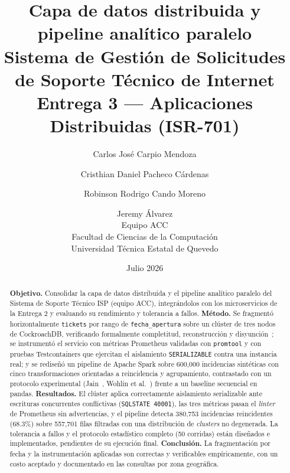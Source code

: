 \documentclass[11pt,letterpaper]{article}
\title{\textbf{Capa de datos distribuida y pipeline anal\'itico paralelo}\\
\large Sistema de Gesti\'on de Solicitudes de Soporte T\'ecnico de Internet\\
\large Entrega 3 --- Aplicaciones Distribuidas (ISR-701)}
\author{
Carlos Jos\'e Carpio Mendoza \and
Cristhian Daniel Pacheco C\'ardenas \and
Robinson Rodrigo Cando Moreno \and
Jeremy \'Alvarez\\[1em]
\normalsize Equipo ACC\\
\normalsize Facultad de Ciencias de la Computaci\'on\\
\normalsize Universidad T\'ecnica Estatal de Quevedo
}
\date{Julio 2026}
\begin{document}
\maketitle

\begin{abstract}
\noindent
\textbf{Objetivo.} Consolidar la capa de datos distribuida y el pipeline analítico paralelo del
Sistema de Soporte Técnico ISP (equipo ACC), integrándolos con los microservicios de la Entrega 2
y evaluando su rendimiento y tolerancia a fallos. \textbf{Método.} Se fragmentó horizontalmente \texttt{tickets} por rango de
\texttt{fecha\_apertura} sobre un clúster de tres nodos de CockroachDB, verificando formalmente
completitud, reconstrucción y disyunción~\cite{ozsu2011principles}; se instrumentó el servicio con
métricas Prometheus validadas con \texttt{promtool} y con pruebas Testcontainers que ejercitan el
aislamiento \texttt{SERIALIZABLE} contra una instancia real; y se rediseñó un pipeline de Apache
Spark sobre 600{,}000 incidencias sintéticas con cinco transformaciones orientadas a reincidencia
y agrupamiento, contrastado con un protocolo experimental
(Jain~\cite{jain1991art}, Wohlin et al.~\cite{wohlin2012experimentation}) frente a un baseline
secuencial en pandas.
\textbf{Resultados.} El clúster aplica correctamente aislamiento serializable ante escrituras
concurrentes conflictivas (\texttt{SQLSTATE 40001}), las tres métricas pasan el \emph{linter} de
Prometheus sin advertencias, y el pipeline detecta 380{,}753 incidencias reincidentes (68.3\%)
sobre 557{,}701 filas filtradas con una distribución de \emph{clusters} no degenerada. La
tolerancia a fallos y el protocolo estadístico completo (50 corridas) están diseñados e
implementados, pendientes de su ejecución final. \textbf{Conclusión.} La fragmentación por fecha
y la instrumentación aplicadas son correctas y verificables empíricamente, con un costo aceptado
y documentado en las consultas por zona geográfica.
\end{abstract}
\end{document}
